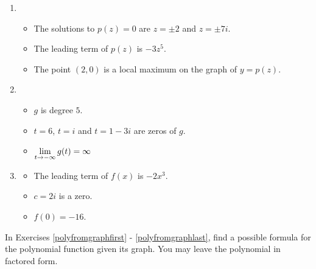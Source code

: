 \documentclass{ximera}
\begin{document}
\begin{enumerate}
\item

\begin{itemize}

\item The solutions to $p(z) = 0$ are $z = \pm 2$ and $z=\pm 7i$.
\item The leading term of $p(z)$ is $-3z^5$.
\item The point $(2,0)$ is a local maximum on the graph of $y=p(z)$.

\end{itemize}


\item

\begin{itemize}

\item $g$ is degree $5$.
\item $t=6$, $t = i$ and $t = 1-3i$ are zeros of $g$.
\item $\ds{\lim_{t \rightarrow -\infty} g(t) = \infty}$ 

\end{itemize}

\item \label{buildcompolylast}

\begin{itemize}

\item The leading term of $f(x)$ is $-2x^3$.
\item $c=2i$ is a zero.
\item $f(0) = -16$.

\end{itemize}

\setcounter{HW}{\value{enumi}}
\end{enumerate}



In Exercises \ref{polyfromgraphfirst} - \ref{polyfromgraphlast}, find a possible formula for the polynomial function given its graph.  You may leave the polynomial in factored form. 
\end{document}
